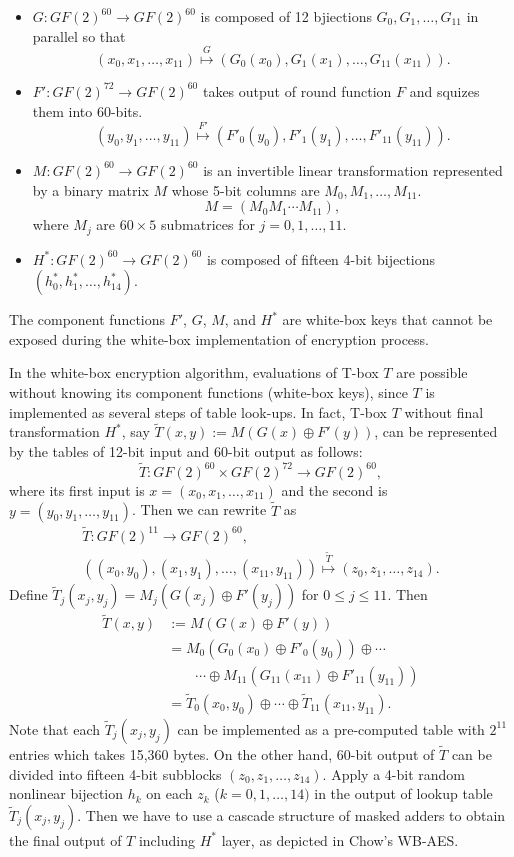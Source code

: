 \documentclass{ieeeaccess}
\begin{document}
\begin{itemize}
\item $G: GF(2)^{60} \to GF(2)^{60}$ is composed of 12 bjiections
$G_0, G_1, \ldots, G_{11}$ in parallel so that
\[
(x_0, x_1, \ldots, x_{11}) \stackrel{G}{\mapsto} (G_0(x_0), G_1(x_1),\ldots, G_{11}(x_{11})).
\]
\item $F': GF(2)^{72} \to GF(2)^{60}$ takes output of round function $F$ and
squizes them into 60-bits.
\[
(y_0, y_1, \ldots, y_{11}) \stackrel{F'}{\mapsto} (F'_0(y_0), F'_1(y_1),\ldots, F'_{11}(y_{11})).
\]
\item $M: GF(2)^{60} \to GF(2)^{60}$ is an invertible linear transformation represented
by a binary matrix $M$ whose 5-bit columns are $M_0, M_1, \ldots, M_{11}$.
\[
M = \left( M_0 M_1 \cdots M_{11} \right), 
\]
where $M_j$ are $60\times 5$ submatrices for $j=0,1,\ldots, 11$.
\item $H^*: GF(2)^{60} \to GF(2)^{60}$ is composed of fifteen 4-bit bijections
$(h^*_0, h^*_1, \ldots, h^*_{14})$.
\end{itemize}
The component functions $F'$, $G$, $M$, and $H^*$ are
white-box keys that cannot be exposed during the white-box implementation of encryption process.

In the white-box encryption algorithm,
evaluations of T-box $T$ are possible without knowing its component functions (white-box keys),
since $T$ is implemented as several steps of table look-ups.
In fact, T-box $T$ without final transformation $H^*$, 
say $\tilde T(x,y):= M(G(x)\oplus F'(y))$, can be represented
by the tables of 12-bit input and 60-bit output as follows:
\[
\tilde T: GF(2)^{60} \times GF(2)^{72} \to GF(2)^{60}, 
\]
where its first input is $x = (x_0, x_1, \ldots, x_{11})$  
and the second is $y = (y_0, y_1, \ldots , y_{11})$.
Then we can rewrite $\tilde T$ as  
\begin{gather*}
\tilde T: GF(2)^{11} \to GF(2)^{60},\\
\left( (x_0, y_0), (x_1, y_1), \ldots, (x_{11}, y_{11}) \right)
\stackrel{\tilde T}{\mapsto} (z_0, z_1, \ldots, z_{14}).
\end{gather*}
Define $\tilde T_j(x_j, y_j) = M_j( G(x_j) \oplus F'(y_j))$ for
$0\le j \le 11$.
Then 
\begin{align*}
\tilde T(x,y) & := M(G(x)\oplus F'(y)) \\
&= M_0(G_0(x_0)\oplus F'_0(y_0)) \oplus \cdots \\
& \quad\quad \cdots\oplus M_{11}(G_{11}(x_{11}) \oplus F'_{11}(y_{11})) \\
&= \tilde T_0(x_0, y_0) \oplus \cdots \oplus \tilde T_{11}(x_{11}, y_{11}).
\end{align*}
Note that each $\tilde T_j(x_j, y_j)$ can be implemented
as a pre-computed table with $2^{11}$ entries which takes 15,360 bytes.
On the other hand, 60-bit output of $\tilde T$ can be divided into 
fifteen 4-bit subblocks $(z_0, z_1, \ldots, z_{14})$.
Apply a 4-bit random nonlinear bijection $h_k$ on each $z_k$ ($k=0,1,\ldots, 14)$
in the output of lookup table $\tilde T_j(x_j, y_j)$. Then
we have to use a cascade structure of masked adders 
to obtain the final output of $T$ including $H^*$ layer, 
as depicted in Chow's WB-AES.
\end{document}
